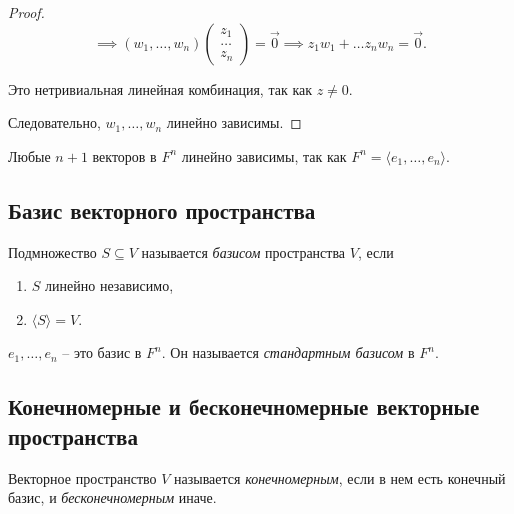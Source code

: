 \begin{proof}
    \begin{equation*}
        \implies (w_1, \dots, w_n) \begin{pmatrix} z_1 \\ \dots \\ z_n \end{pmatrix} = \overrightarrow{0} \implies z_1 w_1 + \dots z_n w_n = \overrightarrow{0}
    .\end{equation*}

    Это нетривиальная линейная комбинация, так как $z \neq 0$.

    Следовательно, $w_1, \dots, w_n$ линейно зависимы.
\end{proof}

\begin{example}
    Любые $n + 1$ векторов в $F^n$ линейно зависимы, так как $F^n = \langle e_1, \dots, e_n \rangle$.
\end{example}


\subsection{Базис векторного пространства}

\begin{definition}
    Подмножество $S \subseteq V$ называется \textit{базисом} пространства $V$, если
    \begin{enumerate}[nosep]
    \item $S$ линейно независимо,
    \item $\langle S \rangle = V$.
    \end{enumerate}
\end{definition}

\begin{example}
    $e_1, \dots, e_n$ -- это базис в $F^n$. Он называется \textit{стандартным базисом} в $F^n$.
\end{example}

\begin{comment}
    Всякая линейно независимая система векторов является базисом своей линейной оболочки.
\end{comment}


\subsection{Конечномерные и бесконечномерные векторные пространства}

\begin{definition}
    Векторное пространство $V$ называется \textit{конечномерным}, если в нем есть конечный базис, и \textit{бесконечномерным} иначе.
\end{definition}


